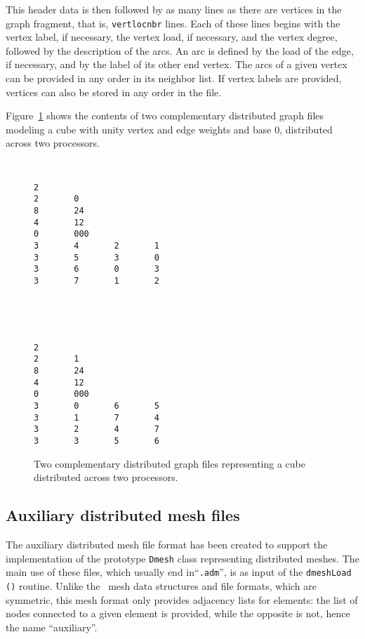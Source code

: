 This header data is then followed by as many lines as there are
vertices in the graph fragment, that is, {\tt vert\lbo loc\lbo nbr}
lines. Each of these lines begins with the vertex label, if necessary,
the vertex load, if necessary, and the vertex degree, followed by the
description of the arcs. An arc is defined by the load of the edge, if
necessary, and by the label of its other end vertex.
The arcs of a given vertex can be provided in any order in its
neighbor list. If vertex labels are provided, vertices can also be
stored in any order in the file.

Figure~\ref{fig-file-dsgraph} shows the contents of two complementary
distributed graph files modeling a cube with unity vertex and edge
weights and base $0$, distributed across two processors.

\begin{figure}[hbt]
\begin{center}
\begin{minipage}{4.0cm}
{\renewcommand{\baselinestretch}{1.05}
 \footnotesize \tt
\begin{verbatim}
2
2       0
8       24
4       12
0       000
3       4       2       1
3       5       3       0
3       6       0       3
3       7       1       2
\end{verbatim}}
\end{minipage}
\hfil~\hfil
\begin{minipage}{4.0cm}
{\renewcommand{\baselinestretch}{1.05}
 \footnotesize \tt
\begin{verbatim}
2
2       1
8       24
4       12
0       000
3       0       6       5
3       1       7       4
3       2       4       7
3       3       5       6
\end{verbatim}}
\end{minipage}
\end{center}
\caption{Two complementary distributed graph files representing
a cube distributed across two processors.}
\label{fig-file-dsgraph}
\end{figure}

\subsection{Auxiliary distributed mesh files}
\label{sec-file-admesh}

The auxiliary distributed mesh file format has been created to support
the implementation of the prototype \texttt{Dmesh} class representing
distributed meshes. The main use of these files, which usually end
in``{\tt \@.adm}'', is as input of the \texttt{dmesh\lbt Load\,()}
routine. Unlike the \scotch\ mesh data structures and file formats,
which are symmetric, this mesh format only provides adjacency lists
for elements: the list of nodes connected to a given element is
provided, while the opposite is not, hence the name ``auxiliary''.

